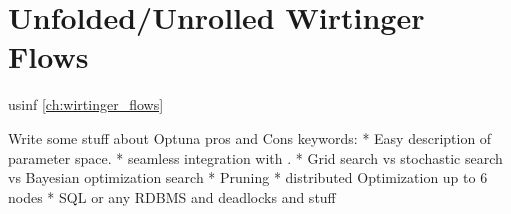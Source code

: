 \chapter{Unfolded/Unrolled Wirtinger Flows}


usinf \cref{ch:wirtinger_flows}






Write some stuff about Optuna pros and Cons
keywords:
* Easy description of parameter space.
* seamless integration with \pytorch. 
* Grid search vs stochastic search vs Bayesian optimization search
* Pruning 
* distributed Optimization up to 6 nodes
* \ac{SQL} or any \ac{RDBMS} and deadlocks and stuff